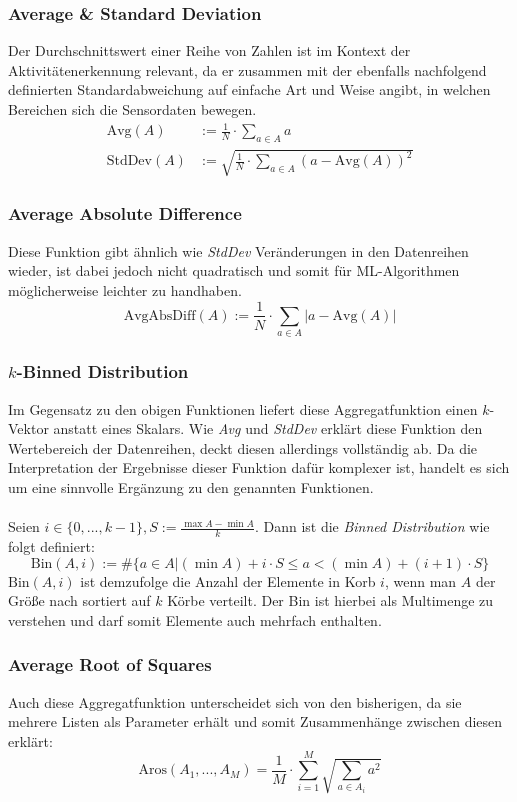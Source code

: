 \subsubsection{Average \& Standard Deviation}
Der Durchschnittswert einer Reihe von Zahlen ist im Kontext der Aktivitätenerkennung relevant, da er zusammen mit der ebenfalls nachfolgend definierten Standardabweichung auf einfache Art und Weise angibt, in welchen Bereichen sich die Sensordaten bewegen.
\begin{align*}
\text{Avg}(A) &:= \frac{1}{N} \cdot \sum_{a \in A} a \\
\text{StdDev}(A) &:= \sqrt{\frac{1}{N} \cdot \sum_{a \in A} (a - \text{Avg}(A))^2}
\end{align*}
\subsubsection{Average Absolute Difference}
Diese Funktion gibt ähnlich wie \textit{StdDev} Veränderungen in den Datenreihen wieder, ist dabei jedoch nicht quadratisch und somit für ML-Algorithmen möglicherweise leichter zu handhaben.
\[
\text{AvgAbsDiff}(A) := \frac{1}{N} \cdot \sum_{a \in A} |a - \text{Avg}(A)|
\]
\subsubsection{$k$-Binned Distribution}
Im Gegensatz zu den obigen Funktionen liefert diese Aggregatfunktion einen $k$-Vektor anstatt eines Skalars. Wie \textit{Avg} und \textit{StdDev} erklärt diese Funktion den Wertebereich der Datenreihen, deckt diesen allerdings vollständig ab. Da die Interpretation der Ergebnisse dieser Funktion dafür komplexer ist, handelt es sich um eine sinnvolle Ergänzung zu den genannten Funktionen.
\\\\
Seien $i \in \{0, ..., k - 1\}, S := \frac{\max A - \min A}{k}$. Dann ist die \textit{Binned Distribution} wie folgt definiert:
\[
\text{Bin}(A, i) := \#\{a \in A | (\min A) + i \cdot S \leq a < (\min A) + (i + 1) \cdot S\}
\]
$\text{Bin}(A, i)$ ist demzufolge die Anzahl der Elemente in Korb $i$, wenn man $A$ der Größe nach sortiert auf $k$ Körbe verteilt. Der Bin ist hierbei als Multimenge zu verstehen und darf somit Elemente auch mehrfach enthalten.
\subsubsection{Average Root of Squares}
Auch diese Aggregatfunktion unterscheidet sich von den bisherigen, da sie mehrere Listen als Parameter erhält und somit Zusammenhänge zwischen diesen erklärt:
\[
\text{Aros}(A_1, ..., A_M) = \frac{1}{M} \cdot \sum_{i = 1}^{M} \sqrt{\sum_{a \in A_i} a^2}
\]
